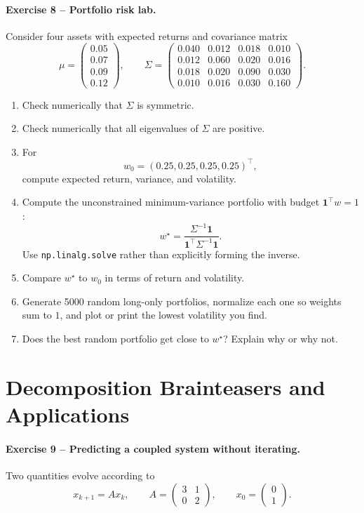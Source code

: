 \documentclass[10pt]{article}
\begin{document}
\paragraph{Exercise 8 -- Portfolio risk lab.}
Consider four assets with expected returns and covariance matrix
\[
\mu=
\begin{pmatrix}
0.05\\0.07\\0.09\\0.12
\end{pmatrix},
\qquad
\Sigma=
\begin{pmatrix}
0.040&0.012&0.018&0.010\\
0.012&0.060&0.020&0.016\\
0.018&0.020&0.090&0.030\\
0.010&0.016&0.030&0.160
\end{pmatrix}.
\]

\begin{enumerate}
\item Check numerically that $\Sigma$ is symmetric.
\item Check numerically that all eigenvalues of $\Sigma$ are positive.
\item For
\[
w_0=(0.25,0.25,0.25,0.25)^\top,
\]
compute expected return, variance, and volatility.
\item Compute the unconstrained minimum-variance portfolio with budget
$\mathbf{1}^\top w=1$:
\[
w^\star=\frac{\Sigma^{-1}\mathbf{1}}
{\mathbf{1}^\top\Sigma^{-1}\mathbf{1}}.
\]
Use \texttt{np.linalg.solve} rather than explicitly forming the inverse.
\item Compare $w^\star$ to $w_0$ in terms of return and volatility.
\item Generate 5000 random long-only portfolios, normalize each one so weights
sum to $1$, and plot or print the lowest volatility you find.
\item Does the best random portfolio get close to $w^\star$? Explain why or
why not.
\end{enumerate}

\section{Decomposition Brainteasers and Applications}

\paragraph{Exercise 9 -- Predicting a coupled system without iterating.}
Two quantities evolve according to
\[
x_{k+1}=Ax_k,
\qquad
A=\begin{pmatrix}3&1\\0&2\end{pmatrix},
\qquad
x_0=\begin{pmatrix}0\\1\end{pmatrix}.
\]
\end{document}
